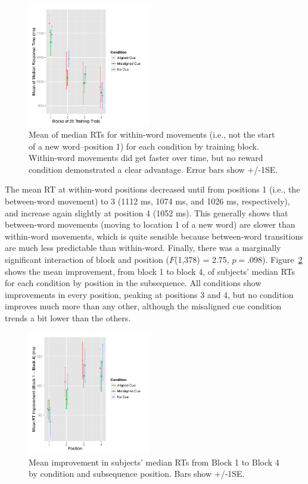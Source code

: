 \documentclass[conference]{IEEEtran}
\begin{document}
\begin{figure}[h]
  \centering
  \includegraphics[width=0.48\textwidth]{figures/exp2_RT_withinWord_over_training}
  \caption{Mean of median RTs for within-word movements (i.e., not the start of a new word--position 1) for each condition by training block. Within-word movements did get faster over time, but no reward condition demonstrated a clear advantage. Error bars show +/-1SE.}
  \label{fig:exp2basic-rt}
\end{figure} 

The mean RT at within-word positions decreased until from positions 1 (i.e., the between-word movement) to 3 (1112 ms, 1074 ms, and 1026 ms, respectively), and increase again slightly at position 4 (1052 ms). This generally shows that between-word movements (moving to location 1 of a new word) are slower than within-word movements, which is quite sensible because between-word transitions are much less predictable than within-word. Finally, there was a marginally significant interaction of block and position ($F$(1,378) = 2.75, $p=.098$). Figure~\ref{fig:exp2position} shows the mean improvement, from block 1 to block 4, of subjects' median RTs for each condition by position in the subsequence. All conditions show improvements in every position, peaking at positions 3 and 4, but no condition improves much more than any other, although the misaligned cue condition trends a bit lower than the others. 

\begin{figure}[h]
  \centering
  \includegraphics[width=0.48\textwidth]{figures/exp2_RTimprov_pos_by_cond}
  \caption{Mean improvement in subjects' median RTs from Block 1 to Block 4 by condition and subsequence position. Bars show +/-1SE.}
  \label{fig:exp2position}
\end{figure} 
\end{document}
